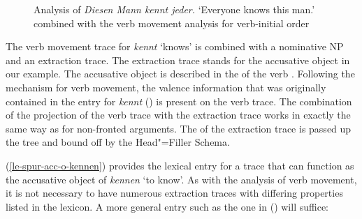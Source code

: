 \begin{figure}
\caption{\label{Abbildung-Diesen-Mann-kennt-jeder}Analysis of \emph{Diesen Mann kennt jeder.} `Everyone knows this man.' combined with the verb movement analysis for verb-initial order}
\end{figure}%
%
The verb movement trace for \emph{kennt} `knows' is combined with a nominative NP and an extraction trace.
The extraction trace stands for the accusative object in our example. The accusative object is
described in the \subcatl of the verb . Following the mechanism for verb movement, the valence information that was originally contained
in the entry for \emph{kennt} () is present on the verb trace. The combination of the projection of the verb trace with
the extraction trace works in exactly the same way as for non-fronted arguments. The \slashv of the extraction trace is passed up the tree
and bound off by the Head"=Filler Schema.

(\ref{le-spur-acc-o-kennen}) provides the lexical entry for a trace
that can function as the accusative object of \emph{kennen} `to know'. As with the analysis of verb movement, it is not necessary to have numerous extraction traces with differing properties 
listed in the lexicon. A more general entry such as the one in () will suffice:

